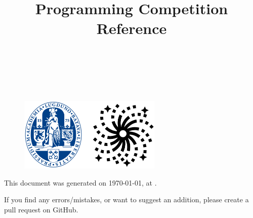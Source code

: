 \documentclass[dvipsnames]{article}
\title{Programming Competition Reference}
\begin{document}
\setlength{\columnseprule}{1pt}
\setlength{\columnsep}{0.8cm}
\def\columnseprulecolor{\color{gray}}

\begin{multicols}{2}


\begin{center}
    \,
    \vspace{1pt}

    {\bfseries \fontsize{19}{23}\selectfont \doctitle}
    
    \vspace{3pt}
    
    \textsl{\small \authorname \\ \teamname}

    \vspace{8pt}

    \begin{figure}[H]
    \centering
    \includegraphics[height=100pt]{logo.png}
    \label{fig:logo}

    \vspace{-30pt}
\end{figure}
\end{center}


\setlength{\abovedisplayskip}{0pt}
\setlength{\belowdisplayskip}{0pt}
\setlength{\abovedisplayshortskip}{0pt}
\setlength{\belowdisplayshortskip}{0pt}


\renewcommand\contentsname{}
\tableofcontents



\lipsum[4-8]


\lipsum[4-8]


\lipsum[10-11]

\end{multicols}


{\color{gray}\centering

This document was generated on \today, at \currenttime.

If you find any errors/mistakes, or want to suggest an addition, please create a pull request on GitHub.

}

\label{LastPage}
\end{document}
